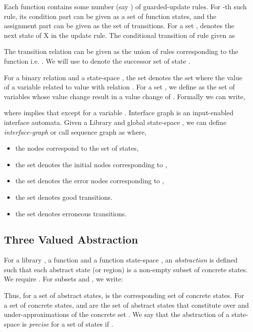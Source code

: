 \documentclass{llncs}
\begin{document}
Each function  contains some number (say ) of guarded-update rules. 
For  -th such rule, its condition part  can be given as a set of function states, and the assignment part  can be given as the set of transitions.
For a set ,  denotes the next state of X in the  update rule.
The conditional transition of rule  given as 

The transition relation  can be given as the union of rules corresponding to the function  i.e. .
We will use  to denote the successor set of state .  

For a binary relation  and a state-space , the set 
 denotes the set where the value of a variable  related to value  with relation . 
For a set , we define   as the set of variables whose
value change result in a value change of .
Formally we can write, 

where  implies that  except for a variable .
 Interface graph is an input-enabled interface automata.
 Given a Library  and global state-space ,
 we can define  {\em interface-graph} or call sequence graph as   where, 
 \begin{itemize}
 \item the nodes  correspond to the set of states,
 \item the set  denotes the initial nodes corresponding to , 
 \item the set  denotes the error nodes corresponding to ,
 \item the set  denotes  good transitions.
  \item the set  denotes erroneous transitions.
 \end{itemize}









\subsection{Three Valued Abstraction} 
For a library , a function  and a function state-space , 
an {\em abstraction\/}  is defined such that
each abstract state (or region)  is a non-empty subset  of
concrete states.   
We require .  
For subsets  and , we write: 

Thus, for a set  of abstract states, 
is the corresponding set of concrete states. 
For a set  of concrete states,  and 
 are the set of abstract states that constitute over and
under-approximations of the concrete set . 
We say that the abstraction  of a state-space  is 
{\em precise\/} for a set  of states if 
. 
\end{document}
